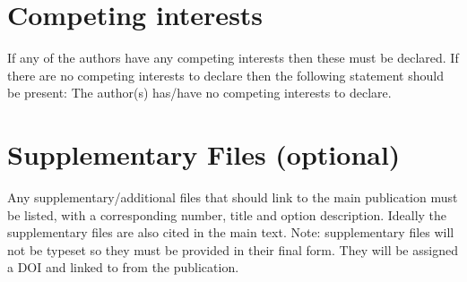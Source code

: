 \documentclass{article}
\begin{document}
\section*{Competing interests} 
If any of the authors have any competing interests then these must be declared. If there are no competing interests to declare then the following statement should be present: The author(s) has/have no competing interests to declare.





\section*{Supplementary Files (optional)}
Any supplementary/additional files that should link to the main publication must be listed, with a corresponding number, title and option description. Ideally the supplementary files are also cited in the main text.
Note: supplementary files will not be typeset so they must be provided in their final form. They will be assigned a DOI and linked to from the publication.
\end{document}
